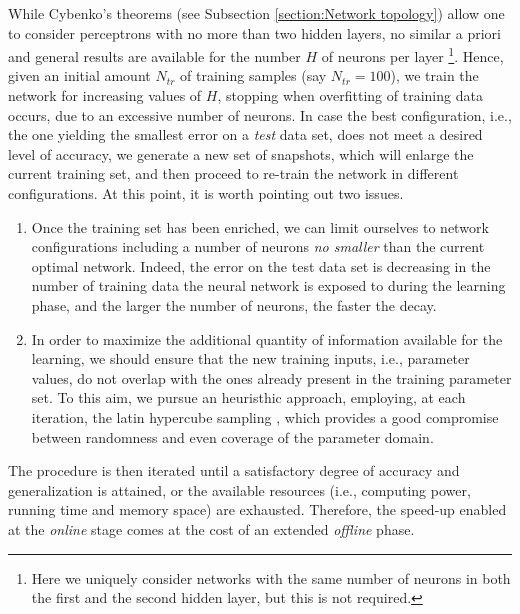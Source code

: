 \documentclass[longtitle]{elsarticle}
\numberwithin{equation}{section}
\theoremstyle{theorem}
\theoremstyle{definition}
\theoremstyle{remark}
\theoremstyle{proposition}
\numberwithin{figure}{section}
\begin{document}
		While Cybenko's theorems (see Subsection \ref{section:Network topology}) allow one to consider perceptrons with no more than two hidden layers, no similar a priori and general results are available for the number $H$ of neurons per layer \footnote{ Here we uniquely consider networks with the same number of neurons in both the first and the second hidden layer, but this is not required.}. Hence, given an initial amount $N_{tr}$ of training samples (say $N_{tr} = 100$), we train the network for increasing values of $H$, stopping when overfitting of training data occurs, due to an excessive number of neurons. In case the best configuration, i.e., the one yielding the smallest error on a \emph{test} data set, does not meet a desired level of accuracy, we generate a new set of snapshots, which will enlarge the current training set, and then proceed to re-train the network in different configurations. At this point, it is worth pointing out two issues. 
		\begin{enumerate}[label=(\roman*)]
			\vspace*{-0.1cm}
			\item Once the training set has been enriched, we can limit ourselves to network configurations including a number of neurons \emph{no smaller} than the current optimal network. Indeed, the error on the test data set is decreasing in the number of training data the neural network is exposed to during the learning phase, and the larger the number of neurons, the faster the decay.
			\item In order to maximize the additional quantity of information available for the learning, we should ensure that the new training inputs, i.e., parameter values, do not overlap with the ones already present in the training parameter set. To this aim, we pursue an heuristhic approach, employing, at each iteration, the latin hypercube sampling \cite{Imam08}, which provides a good compromise between randomness and even coverage of the parameter domain. 	
		\end{enumerate} 
		\vspace*{-0.1cm}
		The procedure is then iterated until a satisfactory degree of accuracy and generalization is attained, or the available resources (i.e., computing power, running time and memory space) are exhausted. Therefore, the speed-up enabled at the \emph{online} stage comes at the cost of an extended \emph{offline} phase. 
		
\end{document}
